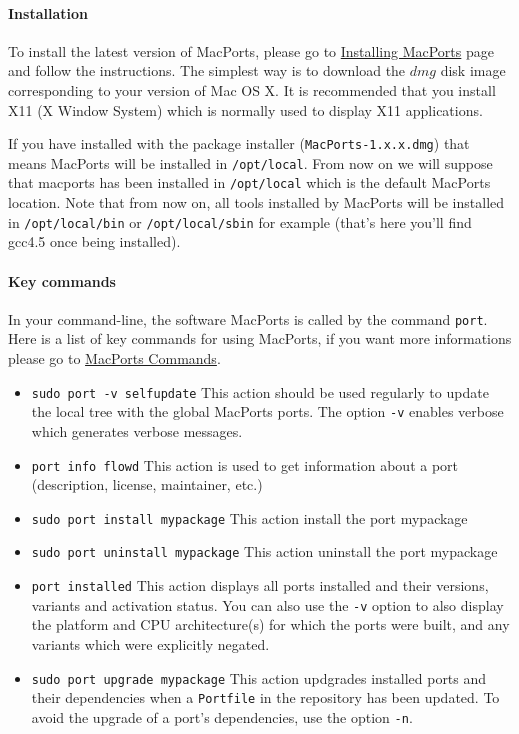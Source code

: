 \paragraph{Installation}
To install the latest version of MacPorts, please go to \href{http://www.macports.org/install.php}{Installing MacPorts} page and follow the instructions. The simplest way is to download the $dmg$ disk image corresponding to your version of Mac OS X. It is recommended that you install X11 (X Window System) which is normally used to display X11 applications.%

If you have installed with the package installer (\lstinline|MacPorts-1.x.x.dmg|) that means MacPorts will be installed in \lstinline|/opt/local|. From now on we will suppose that macports has been installed in \lstinline|/opt/local| which is the default MacPorts location. Note that from now on, all tools installed by MacPorts will be installed in \lstinline!/opt/local/bin! or \lstinline!/opt/local/sbin! for example (that's here you'll find gcc4.5 once being installed).%

\paragraph{Key commands}
In your command-line, the software MacPorts is called by the command \lstinline|port|.
Here is a list of key commands for using MacPorts, if you want more informations please go to \href{http://guide.macports.org/#using.port}{MacPorts Commands}.
\begin{itemize}
\item \lstinline|sudo port -v selfupdate|
	This action should be used regularly to update the local tree with the global MacPorts ports. The option \lstinline|-v| enables verbose which generates verbose messages.
\item \lstinline|port info flowd|
	This action is used to get information about a port (description, license, maintainer, etc.)
\item \lstinline|sudo port install mypackage|
	This action install the port mypackage
\item \lstinline|sudo port uninstall mypackage|
	This action uninstall the port mypackage
\item \lstinline|port installed|
	This action displays all ports installed and their versions, variants and activation status. You can also use the \lstinline|-v| option to also display the platform and CPU architecture(s) for which the ports were built, and any variants which were explicitly negated.
\item \lstinline|sudo port upgrade mypackage|
	This action updgrades installed ports and their dependencies when a \lstinline|Portfile| in the repository has been updated. To avoid the upgrade of a port's dependencies, use the option \lstinline|-n|.
\end{itemize}

